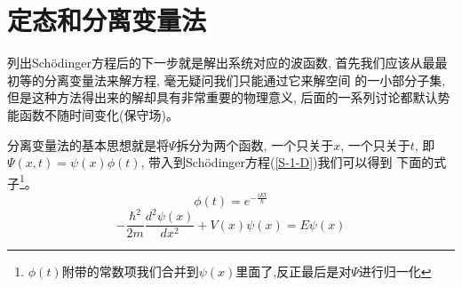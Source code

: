 \documentclass[a4paper,zihao=-4,linespread=1]{ctexrep}
\newenvironment{lequation}{\large\begin{equation}}{\end{equation}}
\begin{document}
    \section{定态和分离变量法}
    列出Sch\"{o}dinger方程后的下一步就是解出系统对应的波函数, 首先我们应该从最最初等的分离变量法来解方程, 毫无疑问我们只能通过它来解空间
    的一小部分子集, 但是这种方法得出来的解却具有非常重要的物理意义, 后面的一系列讨论都默认势能函数不随时间变化(保守场)。

    分离变量法的基本思想就是将$\Psi$拆分为两个函数, 一个只关于$x$, 一个只关于$t$, 即$\Psi(x,t)=\psi(x)\phi(t)$, 带入到Sch\"{o}dinger方程(\ref{S-1-D})我们可以得到
    下面的式子\footnote[1]{$\phi(t)$附带的常数项我们合并到$\psi(x)$里面了,反正最后是对$\Psi$进行归一化}。
    \begin{lequation}
        \label{wiggle-function}
        \boxed{
            \phi(t)=e^{-\frac{iEt}{\hbar}}
        }
    \end{lequation}
    \begin{lequation}
        \label{time-independent-equation}
        \boxed{
            -\frac{\hbar^2}{2m}\frac{d^2\psi(x)}{dx^2}+V(x)\psi(x)=E\psi(x)
        }
    \end{lequation}
\end{document}
